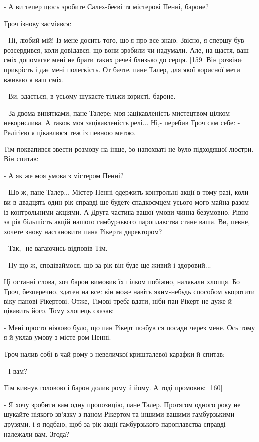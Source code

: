 - А ви тепер щось зробите Салех-беєві та містерові Пенні, бароне?

Троч ізнову засміявся:

- Ні, любий мій! Із мене досить того, що я про все знаю. Звісно, я спершу був розсердився, коли довідався. що вони зробили чи надумали. Але, на щастя, ваш сміх допомагає мені не брати таких речей близько до серця. [159] Він розвіює прикрість і дає мені полегкість. От бачте. пане Талер, для якої корисної мети вживаю я ваш сміх.

- Ви, здається, в усьому шукаєте тільки користі, бароне.

- За двома винятками, пане Талере: моя зацікавленість мистецтвом цілком некорислива. А також моя зацікавленість релі... Ні,- перебив Троч сам себе: - Релігією я цікавлюся теж із певною метою.

Тім поквапився звести розмову на інше, бо напохваті не було підходящої люстри. Він спитав:

- А як же моя умова з містером Пенні?

- Що ж, пане Талер... Містер Пенні одержить контрольні акції в тому разі, коли ви в двадцять один рік справді ще будете спадкоємцем усього мого майна разом із контрольними акціями. А Друга частина вашої умови чинна безумовно. Рівно за рік більшість акцій нашого гамбурзького пароплавства стане ваша. Ви, певне, хочете знову настановити пана Рікерта директором?

- Так,- не вагаючись відповів Тім.

- Ну що ж, сподіваймося, що за рік він буде ще живий і здоровий...

Ці останні слова, хоч барон вимовив їх цілком побіжно, налякали хлопця. Бо Троч, безперечно, здатен на все: він може навіть яким-небудь способом укоротити віку панові Рікертові. Отже, Тімові треба вдати, ніби пан Рікерт не дуже й цікавить його. Тому хлопець сказав:

- Мені просто ніяково було, що пан Рікерт позбув ся посади через мене. Ось тому я й уклав умову з місте ром Пенні.

Троч налив собі в чай рому з невеличкої кришталевої карафки й спитав:

- І вам?

Тім кивнув головою і барон долив рому й йому. А тоді промовив: [160]

- Я хочу зробити вам одну пропозицію, пане Талер. Протягом одного року не шукайте ніякого зв'язку з паном Рікертом та іншими вашими гамбурзькими друзями. і я подбаю, щоб за рік акції гамбурзького пароплавства справді належали вам. Згода?

